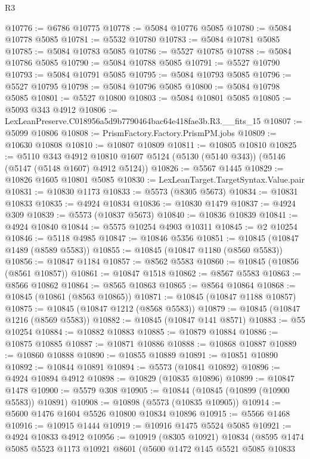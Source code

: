 \begin{lexlean}{R3}
\begin{coremodule}
@10776 := @6786 @10775
@10778 := @5084 @10776 @5085
@10780 := @5084 @10778 @5085
@10781 := @5532 @10780
@10783 := @5084 @10781 @5085
@10785 := @5084 @10783 @5085
@10786 := @5527 @10785
@10788 := @5084 @10786 @5085
@10790 := @5084 @10788 @5085
@10791 := @5527 @10790
@10793 := @5084 @10791 @5085
@10795 := @5084 @10793 @5085
@10796 := @5527 @10795
@10798 := @5084 @10796 @5085
@10800 := @5084 @10798 @5085
@10801 := @5527 @10800
@10803 := @5084 @10801 @5085
@10805 := @5093 @343 @4912
@10806 := LexLeanPreserve.C018956a5d9b7790464bac64e418fae3b.R3.__fits_15
@10807 := @5099 @10806
@10808 := PrismFactory.Factory.PrismPM.jobs
@10809 := @10630 @10808
@10810 := @10807 @10809
@10811 := @10805 @10810
@10825 := @5110
    @343
    @4912
    @10810
    @1607
    @5124
    (@5130 (@5140 @343))
    (@5146 (@5147 (@5148 @1607) @4912 @5124))
@10826 := @5567 @1445
@10829 := @10826 @1605 @10801 @5085
@10830 := LexLeanTarget.TargetSyntax.Value.pair
@10831 := @10830 @1173
@10833 := @5573 (@8305 @5673)
@10834 := @10831 @10833
@10835 := @4924 @10834
@10836 := @10830 @1479
@10837 := @4924 @309
@10839 := @5573 (@10837 @5673)
@10840 := @10836 @10839
@10841 := @4924 @10840
@10844 := @5575 @10254 @4903 @10311
@10845 := @2 @10254
@10846 := @5118 @4985
@10847 := @10846 @5356
@10851 := @10845 (@10847 @1489 (@8589 @5583))
@10855 := @10845 (@10847 @1180 (@8560 @5583))
@10856 := @10847 @1184
@10857 := @8562 @5583
@10860 := @10845 (@10856 (@8561 @10857))
@10861 := @10847 @1518
@10862 := @8567 @5583
@10863 := @8566 @10862
@10864 := @8565 @10863
@10865 := @8564 @10864
@10868 := @10845 (@10861 (@8563 @10865))
@10871 := @10845 (@10847 @1188 @10857)
@10875 := @10845 (@10847 @1212 (@8568 @5583))
@10879 := @10845 (@10847 @1216 (@8569 @5583))
@10882 := @10845 (@10847 @141 @8571)
@10883 := @55 @10254
@10884 := @10882 @10883
@10885 := @10879 @10884
@10886 := @10875 @10885
@10887 := @10871 @10886
@10888 := @10868 @10887
@10889 := @10860 @10888
@10890 := @10855 @10889
@10891 := @10851 @10890
@10892 := @10844 @10891
@10894 := @5573 (@10841 @10892)
@10896 := @4924 @10894 @4912
@10898 := @10829 (@10835 @10896)
@10899 := @10847 @1478
@10900 := @5579 @308
@10905 := @10844 (@10845 (@10899 (@10900 @5583)) @10891)
@10908 := @10898 (@5573 (@10835 @10905))
@10914 := @5600 @1476 @1604 @5526 @10800 @10834 @10896
@10915 := @5566 @1468
@10916 := @10915 @1444
@10919 := @10916 @1475 @5524 @5085
@10921 := @4924 @10833 @4912
@10956 := @10919
    (@8305 @10921)
    @10834
    (@8595
      @1474
      @5085
      @5523
      @1173
      @10921
      @8601
      (@5600
        @1472
        @145
        @5521
        @5085
        @10833

\end{coremodule}
\end{lexlean}
